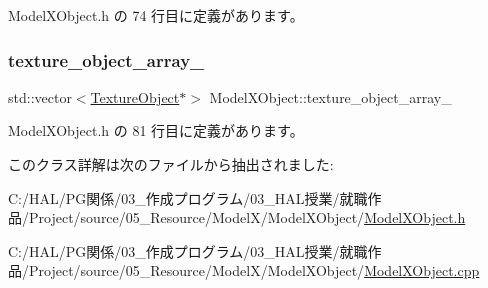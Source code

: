  Model\+X\+Object.\+h の 74 行目に定義があります。

\mbox{\label{class_model_x_object_ab0af78894e6aa05a0aecb3174eafe26b}} 
\subsubsection{\texorpdfstring{texture\+\_\+object\+\_\+array\+\_\+}{texture\_object\_array\_}}
{\footnotesize\ttfamily std\+::vector$<$\mbox{\hyperlink{class_texture_object}{Texture\+Object}}$\ast$$>$ Model\+X\+Object\+::texture\+\_\+object\+\_\+array\+\_\+\hspace{0.3cm}{\ttfamily [private]}}



 Model\+X\+Object.\+h の 81 行目に定義があります。



このクラス詳解は次のファイルから抽出されました\+:\begin{DoxyCompactItemize}
\item 
C\+:/\+H\+A\+L/\+P\+G関係/03\+\_\+作成プログラム/03\+\_\+\+H\+A\+L授業/就職作品/\+Project/source/05\+\_\+\+Resource/\+Model\+X/\+Model\+X\+Object/\mbox{\hyperlink{_model_x_object_8h}{Model\+X\+Object.\+h}}\item 
C\+:/\+H\+A\+L/\+P\+G関係/03\+\_\+作成プログラム/03\+\_\+\+H\+A\+L授業/就職作品/\+Project/source/05\+\_\+\+Resource/\+Model\+X/\+Model\+X\+Object/\mbox{\hyperlink{_model_x_object_8cpp}{Model\+X\+Object.\+cpp}}\end{DoxyCompactItemize}
